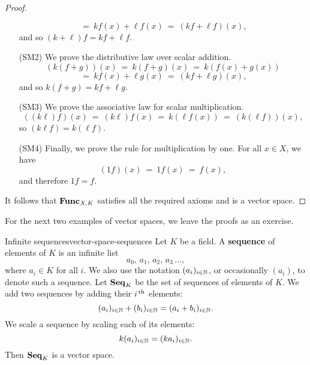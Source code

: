\begin{proof}
\begin{itemize}
\begin{equation*}
      ~=~ kf(x) + \ell f(x)
      ~=~ (kf + \ell f) (x),
    \end{equation*}
    and so $(k + \ell ) f=kf + \ell f$.
  \item[(SM2)] We prove the distributive law over scalar addition.
    \begin{equation*}
      (k(f + g)) (x)
      ~=~ k(f + g) (x)
      ~=~ k(f(x) + g(x))
    \end{equation*}
    \begin{equation*}
      ~=~ kf(x) + \ell g(x)
      ~=~ (kf + \ell g) (x),
    \end{equation*}
    and so $k(f + g) = kf + \ell g$.
  \item[(SM3)] We prove the associative law for scalar multiplication.
    \begin{equation*}
      ((k\ell ) f) (x)
      ~=~ (k\ell) f(x)
      ~=~ k(\ell f(x))
      ~=~ (k(\ell f)) (x),
    \end{equation*}
    so $(k\ell f) =k(\ell f)$.
  \item[(SM4)] Finally, we prove the rule for multiplication by one.
    For all $x\in X$, we have
    \begin{equation*}
      (1f) ( x) ~=~ 1f(x) ~=~f(x),
    \end{equation*}
    and therefore $1f=f$.
  \end{itemize}

  It follows that $\mathbf{Func}_{X,K}$ satisfies all the required axioms and is a
  vector space.
\end{proof}

For the next two examples of vector spaces, we leave the proofs as an
exercise.

\begin{example}{Infinite sequences}{vector-space-sequences}
  Let $K$ be a field. A \textbf{sequence}%
   of elements of $K$ is an infinite list
  \begin{equation*}
    a_0,\,a_1,\,a_2,\,a_3\, \ldots,
  \end{equation*}
  where $a_i\in K$ for all $i$. We also use the notation
  $(a_i)_{i\in\mathbb{N}}$, or occasionally $(a_i)$, to denote such a
  sequence. Let $\mathbf{Seq}_K$ be the set of sequences%
   of elements of $K$. We add two
  sequences by adding their $i^{\,\rm th}$ elements:
  \begin{equation*}
    (a_i)_{i\in\mathbb{N}} + (b_i)_{i\in\mathbb{N}} = (a_i+b_i)_{i\in\mathbb{N}}.
  \end{equation*}
  We scale a sequence by scaling each of its elements:
  \begin{equation*}
    k(a_i)_{i\in\mathbb{N}} = (ka_i)_{i\in\mathbb{N}}.
  \end{equation*}
  Then $\mathbf{Seq}_K$ is a vector space.
\end{example}

